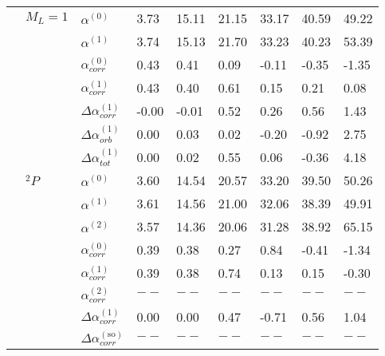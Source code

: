 \begin{longtable}{lllllllll}
      & $M_L=1$ & $\alpha^{(0)}$ &           3.73 &         15.11 &       21.15 &         33.17 &       40.59 &        49.22 \\
      &       & $\alpha^{(1)}$ &           3.74 &         15.13 &       21.70 &         33.23 &       40.23 &        53.39 \\
      &       & $\alpha_{corr}^{(0)}$ &           0.43 &          0.41 &        0.09 &         -0.11 &       -0.35 &        -1.35 \\
      &       & $\alpha_{corr}^{(1)}$ &           0.43 &          0.40 &        0.61 &          0.15 &        0.21 &         0.08 \\
      &       & $\Delta \alpha_{corr}^{(\text{1})}$ &          -0.00 &         -0.01 &        0.52 &          0.26 &        0.56 &         1.43 \\
      &       & $\Delta \alpha_{orb}^{(\text{1})}$ &           0.00 &          0.03 &        0.02 &         -0.20 &       -0.92 &         2.75 \\
      &       & $\Delta \alpha_{tot}^{(\text{1})}$ &           0.00 &          0.02 &        0.55 &          0.06 &       -0.36 &         4.18 \\
      & $^2P$ & $\alpha^{(0)}$ &           3.60 &         14.54 &       20.57 &         33.20 &       39.50 &        50.26 \\
      &       & $\alpha^{(1)}$ &           3.61 &         14.56 &       21.00 &         32.06 &       38.39 &        49.91 \\
      &       & $\alpha^{(2)}$ &           3.57 &         14.36 &       20.06 &         31.28 &       38.92 &        65.15 \\
      &       & $\alpha_{corr}^{(0)}$ &           0.39 &          0.38 &        0.27 &          0.84 &       -0.41 &        -1.34 \\
      &       & $\alpha_{corr}^{(1)}$ &           0.39 &          0.38 &        0.74 &          0.13 &        0.15 &        -0.30 \\
      &       & $\alpha_{corr}^{(2)}$ &            $--$ &           $--$ &         $--$ &           $--$ &         $--$ &          $--$ \\
      &       & $\Delta \alpha_{corr}^{(\text{1})}$ &           0.00 &          0.00 &        0.47 &         -0.71 &        0.56 &         1.04 \\
      &       & $\Delta \alpha_{corr}^{(\text{so})}$ &            $--$ &           $--$ &         $--$ &           $--$ &         $--$ &          $--$ \\

\end{longtable}
